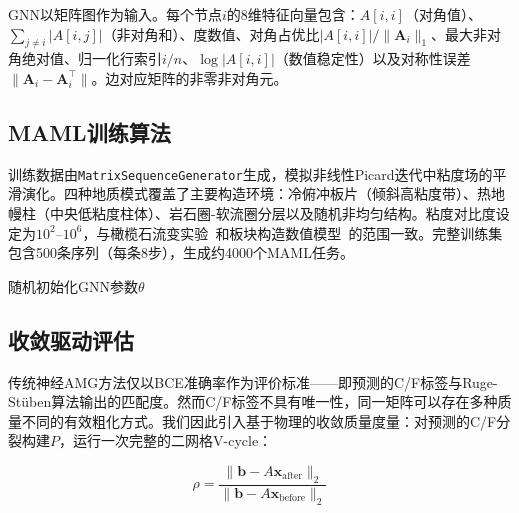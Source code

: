 \documentclass[11pt,a4paper]{ctexart}
\begin{document}
GNN以矩阵图作为输入。每个节点$i$的8维特征向量包含：$A[i,i]$（对角值）、$\sum_{j \neq i}|A[i,j]|$（非对角和）、度数值、对角占优比$|A[i,i]|/\|\mathbf{A}_i\|_1$、最大非对角绝对值、归一化行索引$i/n$、$\log|A[i,i]|$（数值稳定性）以及对称性误差$\|\mathbf{A}_i - \mathbf{A}^\top_i\|$。边对应矩阵的非零非对角元。

\subsection{MAML训练算法}

训练数据由\texttt{MatrixSequenceGenerator}生成，模拟非线性Picard迭代中粘度场的平滑演化。四种地质模式覆盖了主要构造环境：冷俯冲板片（倾斜高粘度带）、热地幔柱（中央低粘度柱体）、岩石圈-软流圈分层以及随机非均匀结构。粘度对比度设定为$10^2$--$10^6$，与橄榄石流变实验~\cite{hirth2003}和板块构造数值模型~\cite{moresi1998}的范围一致。完整训练集包含500条序列（每条8步），生成约4000个MAML任务。

\begin{algorithm}[ht]
\SetAlgoLined
\caption{Meta-AMG元训练}
\label{alg:train}
随机初始化GNN参数$\theta$\;
\end{algorithm}

\subsection{收敛驱动评估}

传统神经AMG方法仅以BCE准确率作为评价标准——即预测的C/F标签与Ruge-St\"{u}ben算法输出的匹配度。然而C/F标签不具有唯一性，同一矩阵可以存在多种质量不同的有效粗化方式。我们因此引入基于物理的收敛质量度量：对预测的C/F分裂构建$P$，运行一次完整的二网格V-cycle：

\begin{equation}
\rho = \frac{\|\mathbf{b} - A\mathbf{x}_{\text{after}}\|_2}{\|\mathbf{b} - A\mathbf{x}_{\text{before}}\|_2}
\label{eq:rho}
\end{equation}
\end{document}
